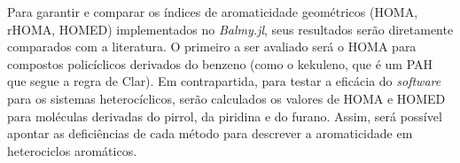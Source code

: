 Para garantir e comparar os índices de aromaticidade geométricos (\gls{HOMA}, \gls{rHOMA}, \gls{HOMED}) implementados no \textit{Balmy.jl}, seus resultados serão diretamente comparados com a literatura. O primeiro a ser avaliado será o \gls{HOMA} para compostos policíclicos derivados do benzeno (como o kekuleno, que é um PAH que segue a regra de Clar).
Em contrapartida, para testar a eficácia do \textit{software} para os sistemas heterocíclicos, serão calculados os valores de \gls{HOMA} e \gls{HOMED} para moléculas derivadas do pirrol, da piridina e do furano. Assim, será possível apontar as deficiências de cada método para descrever a aromaticidade em heterociclos aromáticos.